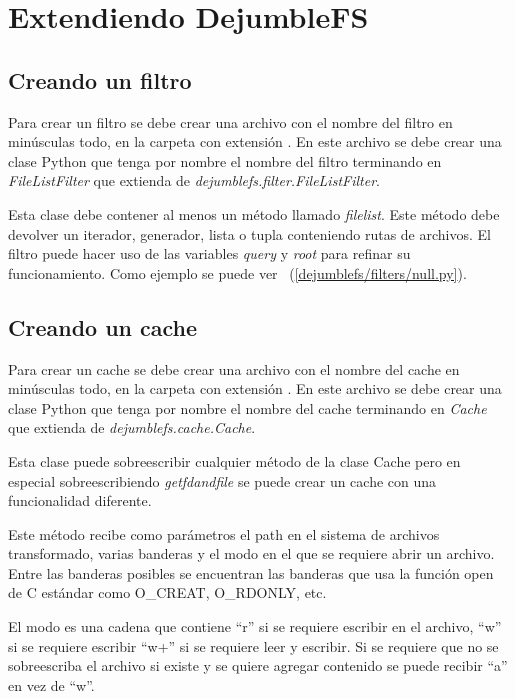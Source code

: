 \section{Extendiendo DejumbleFS}

\subsection{Creando un filtro}

Para crear un filtro se debe crear una archivo con el nombre del filtro en minúsculas todo, en la carpeta  con extensión . En este archivo se debe crear una clase Python que tenga por nombre el nombre del filtro terminando en \textit{FileListFilter} que extienda de \textit{dejumblefs.filter.FileListFilter}.

Esta clase debe contener al menos un método llamado \textit{filelist}. Este método debe devolver un iterador, generador, lista o tupla conteniendo rutas de archivos. El filtro puede hacer uso de las variables \textit{query} y \textit{root} para refinar su funcionamiento. Como ejemplo se puede ver ~(\ref{dejumblefs/filters/null.py}).

\subsection{Creando un cache}

Para crear un cache se debe crear una archivo con el nombre del cache en minúsculas todo, en la carpeta  con extensión . En este archivo se debe crear una clase Python que tenga por nombre el nombre del cache terminando en \textit{Cache} que extienda de \textit{dejumblefs.cache.Cache}.

Esta clase puede sobreescribir cualquier método de la clase Cache pero en especial sobreescribiendo \textit{getfdandfile} se puede crear un cache con una funcionalidad diferente.

Este método recibe como parámetros el path en el sistema de archivos transformado, varias banderas y el modo en el que se requiere abrir un archivo. Entre las banderas posibles se encuentran las banderas que usa la función open de C estándar como O\_CREAT, O\_RDONLY, etc.

El modo es una cadena que contiene ``r'' si se requiere escribir en el archivo, ``w'' si se requiere escribir ``w+'' si se requiere leer y escribir. Si se requiere que no se sobreescriba el archivo si existe y se quiere agregar contenido se puede recibir ``a'' en vez de ``w''.

